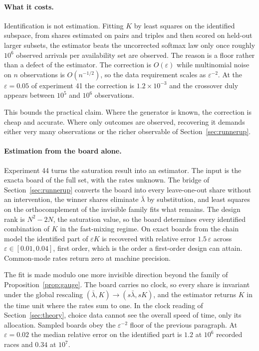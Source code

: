 \documentclass[11pt]{article}
\theoremstyle{remark}
\newcommand{\lbar}{\bar{\lambda}}
\begin{document}
\paragraph{What it costs.} Identification is not estimation. Fitting $K$ by
least squares on the identified subspace, from shares estimated on pairs and
triples and then scored on held-out larger subsets, the estimator beats the
uncorrected softmax law only once roughly $10^6$ observed arrivals per availability set are
observed. The reason is a floor rather than a defect of the estimator. The
correction is $O(\varepsilon)$ while multinomial noise on $n$ observations is
$O(n^{-1/2})$, so the data requirement scales as $\varepsilon^{-2}$. At the
$\varepsilon = 0.05$ of experiment 41 the correction is $1.2\times10^{-3}$ and
the crossover duly appears between $10^5$ and $10^6$ observations.

This bounds the practical claim. Where the
generator is known, the correction is cheap and accurate. Where only outcomes
are observed, recovering it demands either very many observations or the richer
observable of Section~\ref{sec:runnerup}.

\paragraph{Estimation from the board alone.} Experiment 44 turns the
saturation result into an estimator. The input is the exacta board of the full
set, with the rates unknown. The bridge of Section~\ref{sec:runnerup} converts
the board into every leave-one-out share without an intervention, the winner
shares eliminate $\lbar$ by substitution, and least squares on the
orthocomplement of the invisible family fits what remains. The design rank is
$N^2 - 2N$, the saturation value, so the board determines every identified
combination of $K$ in the fast-mixing regime. On exact boards from the chain
model the identified part of $\varepsilon K$ is recovered with relative error
$1.5\,\varepsilon$ across $\varepsilon \in [0.01, 0.04]$, first order,
which is the order a first-order design can attain. Common-mode rates return
zero at machine precision.

The fit is made modulo one more invisible direction beyond the family of
Proposition~\ref{prop:gauge}. The board carries no clock, so every share is
invariant under the global rescaling $(\lbar, K) \to (s\lbar, sK)$, and the
estimator returns $K$ in the time unit where the rates sum to one. In the
clock reading of Section~\ref{sec:theory}, choice data cannot see the overall
speed of time, only its allocation. Sampled boards obey the
$\varepsilon^{-2}$ floor of the previous paragraph. At $\varepsilon = 0.02$
the median relative error on the identified part is $1.2$ at $10^6$ recorded
races and $0.34$ at $10^7$.
\end{document}
